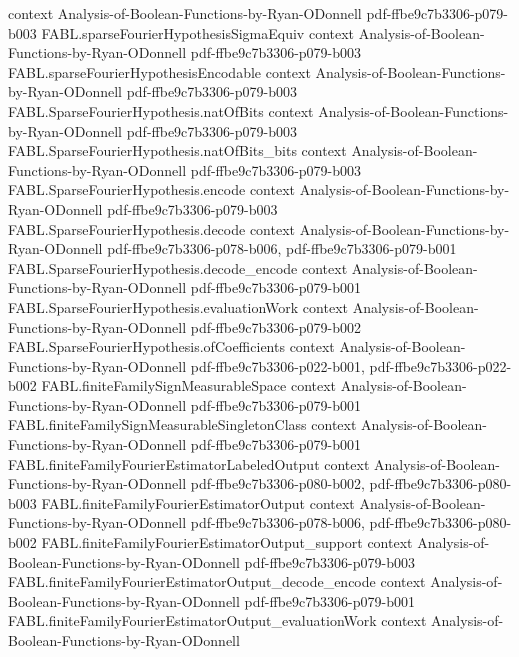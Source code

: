 \begin{theorem}
  {context}
  {Analysis-of-Boolean-Functions-by-Ryan-ODonnell}
  {pdf-ffbe9c7b3306-p079-b003}
\proofstep
  {FABL.sparseFourierHypothesisSigmaEquiv}
  {context}
  {Analysis-of-Boolean-Functions-by-Ryan-ODonnell}
  {pdf-ffbe9c7b3306-p079-b003}
\proofstep
  {FABL.sparseFourierHypothesisEncodable}
  {context}
  {Analysis-of-Boolean-Functions-by-Ryan-ODonnell}
  {pdf-ffbe9c7b3306-p079-b003}
\proofstep
  {FABL.SparseFourierHypothesis.natOfBits}
  {context}
  {Analysis-of-Boolean-Functions-by-Ryan-ODonnell}
  {pdf-ffbe9c7b3306-p079-b003}
\proofstep
  {FABL.SparseFourierHypothesis.natOfBits_bits}
  {context}
  {Analysis-of-Boolean-Functions-by-Ryan-ODonnell}
  {pdf-ffbe9c7b3306-p079-b003}
\proofstep
  {FABL.SparseFourierHypothesis.encode}
  {context}
  {Analysis-of-Boolean-Functions-by-Ryan-ODonnell}
  {pdf-ffbe9c7b3306-p079-b003}
\proofstep
  {FABL.SparseFourierHypothesis.decode}
  {context}
  {Analysis-of-Boolean-Functions-by-Ryan-ODonnell}
  {pdf-ffbe9c7b3306-p078-b006,
    pdf-ffbe9c7b3306-p079-b001}
\proofstep
  {FABL.SparseFourierHypothesis.decode_encode}
  {context}
  {Analysis-of-Boolean-Functions-by-Ryan-ODonnell}
  {pdf-ffbe9c7b3306-p079-b001}
\proofstep
  {FABL.SparseFourierHypothesis.evaluationWork}
  {context}
  {Analysis-of-Boolean-Functions-by-Ryan-ODonnell}
  {pdf-ffbe9c7b3306-p079-b002}
\proofstep
  {FABL.SparseFourierHypothesis.ofCoefficients}
  {context}
  {Analysis-of-Boolean-Functions-by-Ryan-ODonnell}
  {pdf-ffbe9c7b3306-p022-b001,
    pdf-ffbe9c7b3306-p022-b002}
\proofstep
  {FABL.finiteFamilySignMeasurableSpace}
  {context}
  {Analysis-of-Boolean-Functions-by-Ryan-ODonnell}
  {pdf-ffbe9c7b3306-p079-b001}
\proofstep
  {FABL.finiteFamilySignMeasurableSingletonClass}
  {context}
  {Analysis-of-Boolean-Functions-by-Ryan-ODonnell}
  {pdf-ffbe9c7b3306-p079-b001}
\proofstep
  {FABL.finiteFamilyFourierEstimatorLabeledOutput}
  {context}
  {Analysis-of-Boolean-Functions-by-Ryan-ODonnell}
  {pdf-ffbe9c7b3306-p080-b002,
    pdf-ffbe9c7b3306-p080-b003}
\proofstep
  {FABL.finiteFamilyFourierEstimatorOutput}
  {context}
  {Analysis-of-Boolean-Functions-by-Ryan-ODonnell}
  {pdf-ffbe9c7b3306-p078-b006,
    pdf-ffbe9c7b3306-p080-b002}
\proofstep
  {FABL.finiteFamilyFourierEstimatorOutput_support}
  {context}
  {Analysis-of-Boolean-Functions-by-Ryan-ODonnell}
  {pdf-ffbe9c7b3306-p079-b003}
\proofstep
  {FABL.finiteFamilyFourierEstimatorOutput_decode_encode}
  {context}
  {Analysis-of-Boolean-Functions-by-Ryan-ODonnell}
  {pdf-ffbe9c7b3306-p079-b001}
\proofstep
  {FABL.finiteFamilyFourierEstimatorOutput_evaluationWork}
  {context}
  {Analysis-of-Boolean-Functions-by-Ryan-ODonnell}

\end{theorem}
